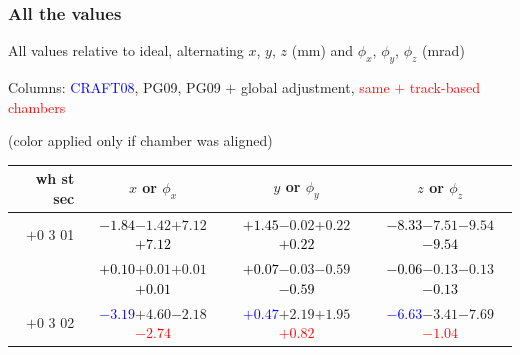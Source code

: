 \documentclass[compress]{beamer}
\begin{document}
\begin{frame}
\frametitle{All the values}
\tiny

All values relative to ideal, alternating $x$, $y$, $z$ (mm) and $\phi_x$, $\phi_y$, $\phi_z$ (mrad)

Columns: \textcolor{blue}{CRAFT08}, PG09, PG09 $+$ global adjustment, \textcolor{red}{same $+$ track-based chambers}

\hfill (color applied only if chamber was aligned)

\vfill
\renewcommand{\arraystretch}{1.1}
\begin{tabular}{r | c | c | c}
wh st sec & $x$ or $\phi_x$ & $y$ or $\phi_y$ & $z$ or $\phi_z$ \\\hline
$+$0 3 01 & \textcolor{black}{$-1.84$}\hspace{0.1 cm}$-1.42$\hspace{0.1 cm}$+7.12$\hspace{0.1 cm}\textcolor{black}{$+7.12$} & \textcolor{black}{$+1.45$}\hspace{0.1 cm}$-0.02$\hspace{0.1 cm}$+0.22$\hspace{0.1 cm}\textcolor{black}{$+0.22$} & \textcolor{black}{$-8.33$}\hspace{0.1 cm}$-7.51$\hspace{0.1 cm}$-9.54$\hspace{0.1 cm}\textcolor{black}{$-9.54$} \\
          & \textcolor{black}{$+0.10$}\hspace{0.1 cm}$+0.01$\hspace{0.1 cm}$+0.01$\hspace{0.1 cm}\textcolor{black}{$+0.01$} & \textcolor{black}{$+0.07$}\hspace{0.1 cm}$-0.03$\hspace{0.1 cm}$-0.59$\hspace{0.1 cm}\textcolor{black}{$-0.59$} & \textcolor{black}{$-0.06$}\hspace{0.1 cm}$-0.13$\hspace{0.1 cm}$-0.13$\hspace{0.1 cm}\textcolor{black}{$-0.13$} \\
$+$0 3 02 & \textcolor{blue}{$-3.19$}\hspace{0.1 cm}$+4.60$\hspace{0.1 cm}$-2.18$\hspace{0.1 cm}\textcolor{red}{$-2.74$} & \textcolor{blue}{$+0.47$}\hspace{0.1 cm}$+2.19$\hspace{0.1 cm}$+1.95$\hspace{0.1 cm}\textcolor{red}{$+0.82$} & \textcolor{blue}{$-6.63$}\hspace{0.1 cm}$-3.41$\hspace{0.1 cm}$-7.69$\hspace{0.1 cm}\textcolor{red}{$-1.04$} \\

\end{tabular}
\end{frame}
\end{document}
